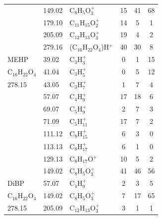 {{\begin{longtable}[c]{lllccc}
                                                         & 149.02 & C$_8$H$_5$O$_3^+$      & 15 & 41 & 68 \\
                                                         & 179.10  & C$_{11}$H$_{15}$O$_2^+$    & 14 & 5  & 1  \\
                                                         & 205.09 & C$_{12}$H$_{13}$O$_3^+$    & 19 & 4  & 2  \\
                                                         & 279.16 & (C$_{16}$H$_{22}$O$_4$)H$^+$ & 40 & 30 & 8 \\
\hline
MEHP                                                     & 39.02  & C$_3$H$_3^+$                   & 0  & 1  & 15 \\
C$_{16}$H$_{22}$O$_4$ & 41.04  & C$_3$H$_5^+$                   & 0  & 5  & 12 \\
278.15                                                   & 43.05  & C$_3$H$_7^+$                   & 1  & 7  & 4  \\
                                                         & 57.07  & C$_4$H$_9^+$                   & 17 & 18 & 6  \\
                                                         & 69.07  & C$_5$H$_9^+$                   & 2  & 7  & 3  \\
                                                         & 71.09  & C$_5$H$_{11}^+$                  & 17 & 7  & 2  \\
                                                         & 111.12 & C$_8$H$_{15}^+$                  & 6  & 3  & 0  \\
                                                         & 113.13 & C$_8$H$_{17}^+$                  & 6  & 1  & 0  \\
                                                         & 129.13 & C$_8$H$_{17}$O$^+$                 & 10 & 5  & 2  \\
                                                         & 149.02 & C$_8$H$_5$O$_3^+$ & 41 & 46 & 56 \\
\hline
DiBP      & 57.07                & C$_4$H$_9^+$                           & 2            & 3            & 5            \\
C$_{16}$H$_{22}$O$_4$          & 149.02               & C$_8$H$_5$O$_3^+$      & 7            & 17           & 65           \\
278.15          & 205.09               & C$_{12}$H$_{13}$O$_3^+$    & 3            & 1            & 1            \\

\end{longtable}}}
